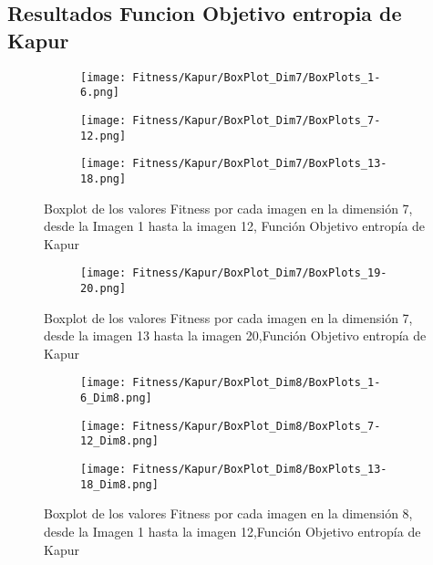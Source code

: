 \documentclass[conference]{IEEEtran}
\begin{document}
\subsection{Resultados Funcion Objetivo entropia de Kapur}
\begin{figure}
    \centering

    \begin{subfigure}{0.5\textwidth}
        \texttt{[image: Fitness/Kapur/BoxPlot\_Dim7/BoxPlots\_1-6.png]}
    \end{subfigure}
    
    \begin{subfigure}{0.5\textwidth}
        \texttt{[image: Fitness/Kapur/BoxPlot\_Dim7/BoxPlots\_7-12.png]}
    \end{subfigure}
         \begin{subfigure}{0.5\textwidth}
        \texttt{[image: Fitness/Kapur/BoxPlot\_Dim7/BoxPlots\_13-18.png]}
    \end{subfigure}
    \caption{Boxplot de los valores Fitness por cada imagen en la dimensión 7, desde la Imagen 1 hasta la imagen 12, Función Objetivo entropía de Kapur}
\label{fig:imagenes}    
\end{figure}

\begin{figure}
    \centering
    \begin{subfigure}{0.5\textwidth}
        \texttt{[image: Fitness/Kapur/BoxPlot\_Dim7/BoxPlots\_19-20.png]}
        \vspace{-150pt} %
    \end{subfigure}
    \caption{Boxplot de los valores Fitness por cada imagen en la dimensión 7, desde la imagen 13 hasta la imagen 20,Función Objetivo entropía de Kapur}
    \label{fig:imagenes}    
\end{figure}

\begin{figure}
    \centering

    \begin{subfigure}{0.5\textwidth}
        \texttt{[image: Fitness/Kapur/BoxPlot\_Dim8/BoxPlots\_1-6\_Dim8.png]}
    \end{subfigure}
    
    \begin{subfigure}{0.5\textwidth}
        \texttt{[image: Fitness/Kapur/BoxPlot\_Dim8/BoxPlots\_7-12\_Dim8.png]}
    \end{subfigure}
         \begin{subfigure}{0.5\textwidth}
        \texttt{[image: Fitness/Kapur/BoxPlot\_Dim8/BoxPlots\_13-18\_Dim8.png]}
    \end{subfigure}
    \caption{Boxplot de los valores Fitness por cada imagen en la dimensión 8, desde la Imagen 1 hasta la imagen 12,Función Objetivo entropía de Kapur}
\label{fig:imagenes}    
\end{figure}
\end{document}
